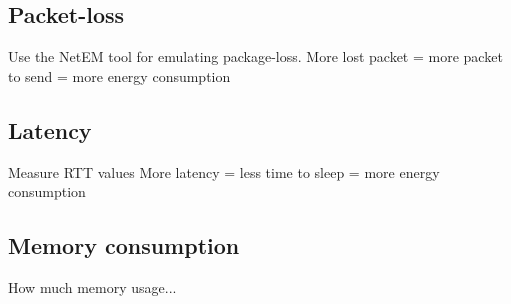 \subsection{Packet-loss}
Use the NetEM tool for emulating package-loss.
More lost packet = more packet to send = more energy consumption


\subsection{Latency}
Measure RTT values %
More latency = less time to sleep = more energy consumption

\subsection{Memory consumption}
How much memory usage...